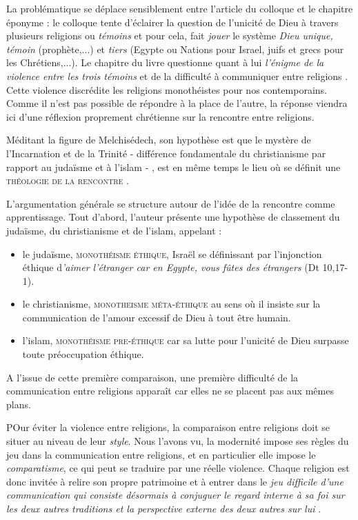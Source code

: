  
La problématique se déplace sensiblement entre l'article du colloque et le chapitre éponyme : le colloque tente d'éclairer la question de l'unicité de Dieu à travers plusieurs religions ou \textit{témoins} et pour cela, fait \textit{jouer} le système \textit{Dieu unique, témoin} (prophète,...) et \textit{tiers} (Egypte ou Nations pour Israel, juifs et grecs pour les Chrétiens,...). 
Le chapitre  du livre questionne quant à lui  \textit{l'énigme de la violence entre les trois témoins} et de la difficulté à communiquer entre religions \cite[p.780]{theobald_christianisme_2007}. Cette violence discrédite les religions monothéistes pour nos contemporains. Comme il n'est pas possible de répondre à la place de l'autre, la réponse viendra ici d'une réflexion proprement chrétienne sur la rencontre entre religions.

 

 
 Méditant la figure de Melchisédech, son hypothèse est que le mystère de l'Incarnation et de la Trinité - différence fondamentale du christianisme par rapport au judaïsme et à l'islam - ,  est en même temps le lieu  où se définit une\textsc{ théologie de la rencontre} \cite[p. 793]{theobald_christianisme_2007}. 
 
 

\newline
 
L'argumentation générale se structure autour de l'idée de la rencontre comme apprentissage.  Tout d'abord, l'auteur présente une hypothèse de classement du judaïsme, du christianisme et de l'islam, appelant :
\begin{itemize}
    \item le judaïsme, \textsc{monothéisme éthique}, Israël se définissant par l'injonction éthique d\textit{'aimer l'étranger car en Egypte, vous fûtes des étrangers} (Dt 10,17-1).  
    \item le christianisme, \textsc{monotheisme méta-éthique} au sens où il insiste sur la communication de l'amour excessif de Dieu à tout être humain.
    \item l'islam, \textsc{monothéisme pre-éthique} car sa lutte pour l'unicité de Dieu surpasse toute préoccupation éthique. 
\end{itemize}
 A l'issue de cette première comparaison, une première difficulté de la communication entre religions apparaît car elles ne se placent pas aux mêmes plans. 


{POur éviter la violence entre religions, la comparaison entre religions doit se situer au niveau de leur \textit{style}.} Nous l'avons vu, la modernité impose ses règles du jeu dans la communication entre religions, et en particulier elle impose le \textit{comparatisme}, ce qui peut se traduire par une réelle violence. Chaque religion est donc invitée à relire son propre patrimoine et à entrer dans le \textit{jeu difficile d'une communication qui consiste désormais à conjuguer le regard interne à sa foi sur les deux autres traditions et la perspective externe des deux autres sur lui} \cite[p. 788]{theobald_christianisme_2007}.

